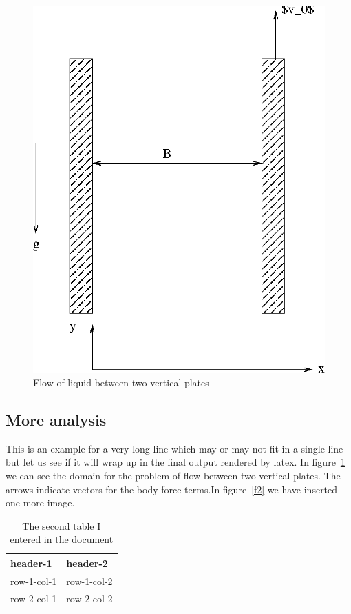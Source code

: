 \documentclass[a4paper, 12pt]{article}
\begin{document}
\begin{figure}[h]
	\begin{center}
		\includegraphics[scale=0.5]{fig1.eps}
	\end{center}
	\caption{Flow of liquid between two vertical plates}
	\label{f1:plates}
\end{figure}



\subsection{More analysis}
This is an example for a very long line which may or may not fit in a single line but let us see if it will wrap up in the final output rendered by latex. In figure~\ref{f1:plates} we can see the domain for the problem of flow between two vertical plates. The arrows indicate vectors for the body force terms.In figure~\ref{f2} we have inserted one more image.

\begin{table}
	\begin{center}
\begin{tabular}{|l|l|}
	\hline
	header-1 & header-2 \\
	\hline
	row-1-col-1 & row-1-col-2 \\
	row-2-col-1 & row-2-col-2 \\
	\hline
\end{tabular}
	\caption{The second table I entered in the document}
	\label{tab:2}
	\end{center}
\end{table}
\end{document}
